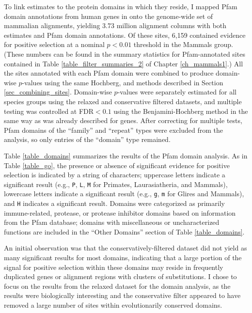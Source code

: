 To link \sw estimates to the protein domains in which they reside, I
mapped Pfam domain annotations from human genes in \ens onto the
genome-wide set of mammalian alignments, yielding 3.73 million
alignment columns with both \sw estimates and Pfam domain
annotations. Of these sites, 6,159 contained evidence for positive
selection at a nominal $p<0.01$ threshold in the Mammals group. (These
numbers can be found in the summary statistics for Pfam-annotated
sites contained in Table \ref{table_filter_summaries_2} of Chapter
\ref{ch_mammals1}.) All the sites annotated with each Pfam domain were
combined to produce domain-wise $p$-values using the same Hochberg,
\psgefive and \psgeone methods described in Section
\ref{sec_combining_sites}. Domain-wise $p$-values were separately
estimated for all species groups using the relaxed and conservative
\sw filtered datasets, and multiple testing was controlled at
FDR$<0.1$ using the Benjamini-Hochberg method in the same way as was
already described for genes. After correcting for multiple tests, Pfam
domains of the ``family'' and ``repeat'' types were excluded from the
analysis, so only entries of the ``domain'' type remained.

Table \ref{table_domains} summarizes the results of the Pfam domain
analysis. As in Table \ref{table_go}, the presence or absence of
significant evidence for positive selection is indicated by a string
of characters; uppercase letters indicate a significant \psgeone
result (e.g., \texttt{P}, \texttt{L}, \texttt{M} for Primates,
Laurasiatheria, and Mammals), lowercase letters indicate a significant
\psgefive result (e.g., \texttt{g}, \texttt{m} for Glires and
Mammals), and \texttt{H} indicates a significant \psghoch
result. Domains were categorized as primarily immune-related,
protease, or protease inhibitor domains based on information from the
Pfam database; domains with miscellaneous or uncharacterized functions
are included in the ``Other Domains'' section of Table
\ref{table_domains}.

An initial observation was that the conservatively-filtered dataset
did not yield as many significant results for most domains, indicating
that a large portion of the signal for positive selection within these
domains may reside in frequently duplicated genes or alignment regions
with clusters of \nsyn substitutions. I chose to focus on the
results from the relaxed dataset for the domain analysis, as the
results were biologically interesting and the conservative filter
appeared to have removed a large number of sites within evolutionarily
conserved domains.

